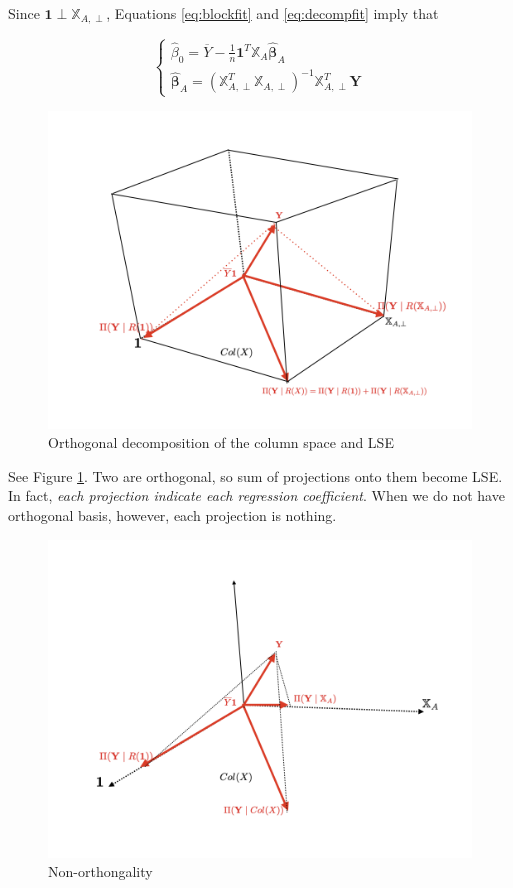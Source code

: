 \documentclass[]{book}
\theoremstyle{definition}
\theoremstyle{definition}
\theoremstyle{definition}
\theoremstyle{remark}
\begin{document}
Since \(\mathbf{1} \perp \mathbb{X}_{A, \perp}\), Equations \eqref{eq:blockfit} and \eqref{eq:decompfit} imply that

\begin{equation}
  \begin{cases}
    \hat\beta_0 = \overline{Y} - \frac{1}{n}\mathbf{1}^T\mathbb{X}_A\boldsymbol{\hat\beta}_A \\
    \boldsymbol{\hat\beta}_A = (\mathbb{X}_{A,\perp}^T\mathbb{X}_{A,\perp})^{-1}\mathbb{X}_{A,\perp}^T\mathbf{Y}
  \end{cases}
  \label{eq:orthbeta}
\end{equation}

\begin{figure}[H]

{\centering \includegraphics[width=0.7\linewidth]{images/multiple-orthogonal} 

}

\caption{Orthogonal decomposition of the column space and LSE}\label{fig:illdecomp}
\end{figure}

See Figure \ref{fig:illdecomp}. Two are orthogonal, so sum of projections onto them become LSE. In fact, \emph{each projection indicate each regression coefficient}. When we do not have orthogonal basis, however, each projection is nothing.

\begin{figure}[H]

{\centering \includegraphics[width=0.7\linewidth]{images/multiple-nonorth} 

}

\caption{Non-orthongality}\label{fig:illdecomp2}
\end{figure}
\end{document}
